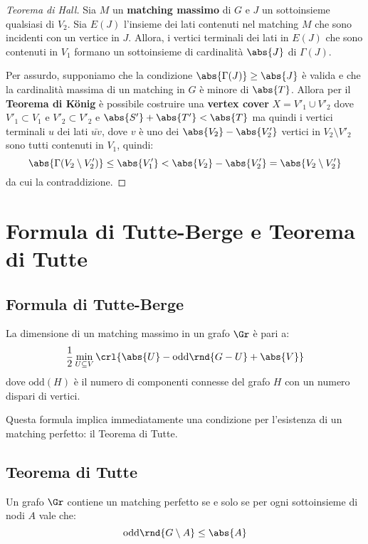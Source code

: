 \documentclass[\main/main.tex]{subfiles}
\begin{document}
\begin{proof}[Teorema di Hall]
	Sia \(M\) un \textbf{matching massimo} di \(G\) e \(J\) un sottoinsieme qualsiasi di \(V_2\). Sia \(E(J)\) l'insieme dei lati contenuti nel matching \(M\) che sono incidenti con un vertice in \(J\). Allora, i vertici terminali dei lati in \(E(J)\) che sono contenuti in \(V_1\) formano un sottoinsieme di cardinalità \(\abs{J}\) di \(\Gamma(J)\).

	Per assurdo, supponiamo che la condizione \(\abs{\Gamma(J)} \geq \abs{J}\) è valida e che la cardinalità massima di un matching in \(G\) è minore di \(\abs{T}\). Allora per il \textbf{Teorema di König} è possibile costruire una \textbf{vertex cover} \(X=V'_1 \cup V'_2\) dove \(V'_1 \subset V_1\) e \(V'_2 \subset V'_2\) e \(\abs{S'} + \abs{T'} < \abs{T}\) ma quindi i vertici terminali \(u\) dei lati \(\bar{uv}\), dove \(v\) è uno dei \(\abs{V_2} - \abs{V'_2}\) vertici in \(V_2\setminus V'_2\) sono tutti contenuti in \(V_1\), quindi:
	\[
		\abs{\Gamma(V_2\setminus V'_2)} \leq \abs{V'_1} < \abs{V_2} - \abs{V'_2} = \abs{V_2\setminus V'_2}
	\]
	da cui la contraddizione.
\end{proof}

\section{Formula di Tutte-Berge e Teorema di Tutte}
\subsection{Formula di Tutte-Berge}
\begin{theorem}
	La dimensione di un matching massimo in un grafo \(\Gr \) è pari a:
	\[
		\frac{1}{2} \min_{U \subseteq V} \crl{\abs{U} - \text{odd}\rnd{G-U} + \abs{V}}
	\]
	dove \(\text{odd}(H)\) è il numero di componenti connesse del grafo \(H\) con un numero dispari di vertici.
\end{theorem}

Questa formula implica immediatamente una condizione per l'esistenza di un matching perfetto: il Teorema di Tutte.

\subsection{Teorema di Tutte}
\begin{theorem}
	Un grafo \(\Gr \) contiene un matching perfetto se e solo se per ogni sottoinsieme di nodi \(A\) vale che:
	\[
		\text{odd}\rnd{G\setminus A} \leq \abs{A}
	\]
\end{theorem}
\clearpage
\end{document}

